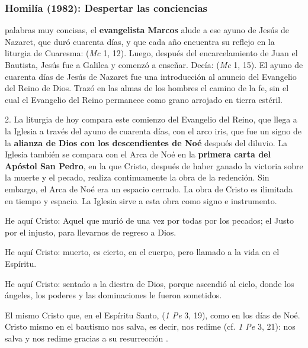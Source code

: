\subsubsection{Homilía (1982): Despertar las conciencias}


\begin{body}
 palabras muy concisas, el \textbf{evangelista Marcos} alude a ese ayuno de Jesús de Nazaret, que duró cuarenta días, y que cada año encuentra su reflejo en la liturgia de Cuaresma:  (\textit{Mc} 1, 12). Luego, después del encarcelamiento de Juan el Bautista, Jesús fue a Galilea y comenzó a enseñar. Decía:  (\textit{Mc} 1, 15). El ayuno de cuarenta días de Jesús de Nazaret fue una introducción al anuncio del Evangelio del Reino de Dios. Trazó en las almas de los hombres el camino de la fe, sin el cual el Evangelio del Reino permanece como grano arrojado en tierra estéril.

2. La liturgia de hoy compara este comienzo del Evangelio del Reino, que llega a la Iglesia a través del ayuno de cuarenta días, con el arco iris, que fue un signo de la \textbf{alianza de Dios con los descendientes de Noé} después del diluvio. La Iglesia también se compara con el Arca de Noé en la \textbf{primera carta del Apóstol San Pedro}, en la que Cristo, después de haber ganado la victoria sobre la muerte y el pecado, realiza continuamente la obra de la redención. Sin embargo, el Arca de Noé era un espacio cerrado. La obra de Cristo es ilimitada en tiempo y espacio. La Iglesia sirve a esta obra como signo e instrumento.

He aquí Cristo: Aquel que murió de una vez por todas por los pecados; el Justo por el injusto, para llevarnos de regreso a Dios.

He aquí Cristo: muerto, es cierto, en el cuerpo, pero llamado a la vida en el Espíritu.

He aquí Cristo: sentado a la diestra de Dios, porque ascendió al cielo, donde los ángeles, los poderes y las dominaciones le fueron sometidos.

El mismo Cristo que, en el Espíritu Santo,  (\textit{1 Pe} 3, 19), como en los días de Noé. Cristo mismo en el bautismo nos salva, es decir, nos redime  (cf. \textit{1 Pe} 3, 21): nos salva y nos redime gracias a su resurrección .


\end{body}
